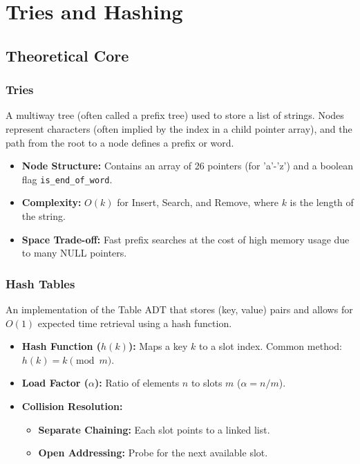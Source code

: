 \chapter{Tries and Hashing}

\section{Theoretical Core}

\subsection{Tries}
\begin{definition}[Trie]
A multiway tree (often called a prefix tree) used to store a list of strings. Nodes represent characters (often implied by the index in a child pointer array), and the path from the root to a node defines a prefix or word.
\end{definition}

\begin{itemize}
    \item \textbf{Node Structure:} Contains an array of 26 pointers (for 'a'-'z') and a boolean flag \texttt{is\_end\_}\allowbreak\texttt{of\_word}.
    \item \textbf{Complexity:} $O(k)$ for Insert, Search, and Remove, where $k$ is the length of the string.
    \item \textbf{Space Trade-off:} Fast prefix searches at the cost of high memory usage due to many NULL pointers.
\end{itemize}

\subsection{Hash Tables}
\begin{definition}
An implementation of the Table ADT that stores (key, value) pairs and allows for $O(1)$ expected time retrieval using a hash function.
\end{definition}

\begin{itemize}
    \item \textbf{Hash Function ($h(k)$):} Maps a key $k$ to a slot index. Common method: $h(k) = k \pmod m$.
    \item \textbf{Load Factor ($\alpha$):} Ratio of elements $n$ to slots $m$ ($\alpha = n/m$).
    \item \textbf{Collision Resolution:}
    \begin{itemize}
        \item \textbf{Separate Chaining:} Each slot points to a linked list.
        \item \textbf{Open Addressing:} Probe for the next available slot.
    \end{itemize}
\end{itemize}

